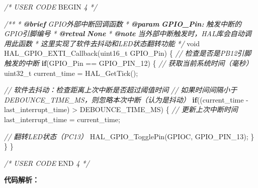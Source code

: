 \documentclass[
  chinese,
  UTF8,
  oneside,
  openany]{ctexbook}
\newenvironment{Shaded}{}{}
\newcommand{\AnnotationTok}[1]{\textcolor[rgb]{0.38,0.63,0.69}{\textbf{\textit{#1}}}}
\newcommand{\CommentTok}[1]{\textcolor[rgb]{0.38,0.63,0.69}{\textit{#1}}}
\newcommand{\CommentVarTok}[1]{\textcolor[rgb]{0.38,0.63,0.69}{\textbf{\textit{#1}}}}
\newcommand{\ControlFlowTok}[1]{\textcolor[rgb]{0.00,0.44,0.13}{\textbf{#1}}}
\newcommand{\DataTypeTok}[1]{\textcolor[rgb]{0.56,0.13,0.00}{#1}}
\newcommand{\InformationTok}[1]{\textcolor[rgb]{0.38,0.63,0.69}{\textbf{\textit{#1}}}}
\newcommand{\NormalTok}[1]{#1}
\newcommand{\OperatorTok}[1]{\textcolor[rgb]{0.40,0.40,0.40}{#1}}
\newcommand{\RegionMarkerTok}[1]{#1}
\begin{document}
\begin{Shaded}
\begin{Highlighting}[]
\CommentTok{/* USER CODE }\RegionMarkerTok{BEGIN}\CommentTok{ 4 */}

\CommentTok{/**}
\CommentTok{  * }\AnnotationTok{@brief}\CommentTok{  GPIO外部中断回调函数}
\CommentTok{  * }\AnnotationTok{@param}\CommentTok{  }\CommentVarTok{GPIO\_Pin:}\CommentTok{ 触发中断的GPIO引脚编号}
\CommentTok{  * }\AnnotationTok{@retval}\CommentTok{ }\CommentVarTok{None}
\CommentTok{  * }\InformationTok{@note}\CommentTok{   当外部中断触发时，HAL库会自动调用此函数}
\CommentTok{  *         这里实现了软件去抖动和LED状态翻转功能}
\CommentTok{  */}
\DataTypeTok{void}\NormalTok{ HAL\_GPIO\_EXTI\_Callback}\OperatorTok{(}\DataTypeTok{uint16\_t}\NormalTok{ GPIO\_Pin}\OperatorTok{)}
\OperatorTok{\{}
  \CommentTok{// 检查是否是PB12引脚触发的中断}
  \ControlFlowTok{if}\OperatorTok{(}\NormalTok{GPIO\_Pin }\OperatorTok{==}\NormalTok{ GPIO\_PIN\_12}\OperatorTok{)}
  \OperatorTok{\{}
    \CommentTok{// 获取当前系统时间（毫秒）}
    \DataTypeTok{uint32\_t}\NormalTok{ current\_time }\OperatorTok{=}\NormalTok{ HAL\_GetTick}\OperatorTok{();}

    \CommentTok{// 软件去抖动：检查距离上次中断是否超过阈值时间}
    \CommentTok{// 如果时间间隔小于DEBOUNCE\_TIME\_MS，则忽略本次中断（认为是抖动）}
    \ControlFlowTok{if}\OperatorTok{((}\NormalTok{current\_time }\OperatorTok{{-}}\NormalTok{ last\_interrupt\_time}\OperatorTok{)} \OperatorTok{\textgreater{}}\NormalTok{ DEBOUNCE\_TIME\_MS}\OperatorTok{)}
    \OperatorTok{\{}
      \CommentTok{// 更新上次中断时间}
\NormalTok{      last\_interrupt\_time }\OperatorTok{=}\NormalTok{ current\_time}\OperatorTok{;}

      \CommentTok{// 翻转LED状态（PC13）}
\NormalTok{      HAL\_GPIO\_TogglePin}\OperatorTok{(}\NormalTok{GPIOC}\OperatorTok{,}\NormalTok{ GPIO\_PIN\_13}\OperatorTok{);}
    \OperatorTok{\}}
  \OperatorTok{\}}
\OperatorTok{\}}

\CommentTok{/* USER CODE }\RegionMarkerTok{END}\CommentTok{ 4 */}
\end{Highlighting}
\end{Shaded}

\textbf{代码解析：}
\end{document}
